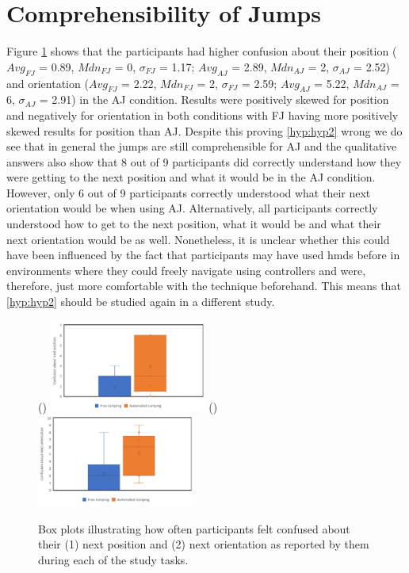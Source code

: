 \section{Comprehensibility of Jumps}
\label{subsection EUS: Comprehensibility of Jumps}
Figure \ref{fig:jump-comprehensibility} shows that the participants had higher confusion about their position ($Avg_{FJ}$ = 0.89, $Mdn_{FJ}$ = 0, $\sigma_{FJ}$ = 1.17; $Avg_{AJ}$ = 2.89, $Mdn_{AJ}$ = 2, $\sigma_{AJ}$ = 2.52) and orientation ($Avg_{FJ}$ = 2.22, $Mdn_{FJ}$ = 2, $\sigma_{FJ}$ = 2.59; $Avg_{AJ}$ = 5.22, $Mdn_{AJ}$ = 6, $\sigma_{AJ}$ = 2.91) in the AJ condition. Results were positively skewed for position and negatively for orientation in both conditions with FJ having more positively skewed results for position than AJ. 
Despite this proving \cref{hyp:hyp2} wrong we do see that in general the jumps are still comprehensible for AJ and the qualitative answers also show that 8 out of 9 participants did correctly understand how they were getting to the next position and what it would be in the AJ condition. However, only 6 out of 9 participants correctly understood what their next orientation would be when using AJ. Alternatively, all participants correctly understood how to get to the next position, what it would be and what their next orientation would be as well. Nonetheless, it is unclear whether this could have been influenced by the fact that participants may have used \acrshort{hmd}s before in environments where they could freely navigate using controllers and were, therefore, just more comfortable with the technique beforehand. This means that \cref{hyp:hyp2} should be studied again in a different study.

\begin{figure}[]
	()
	\includegraphics[width=0.46\textwidth]{images/position.pdf}
	()
	\includegraphics[width=0.46\textwidth]{images/orientation.pdf}
	\caption{Box plots illustrating how often participants felt confused about their (1) next position and (2) next orientation as reported by them during each of the study tasks.}
	\label{fig:jump-comprehensibility}
\end{figure}

